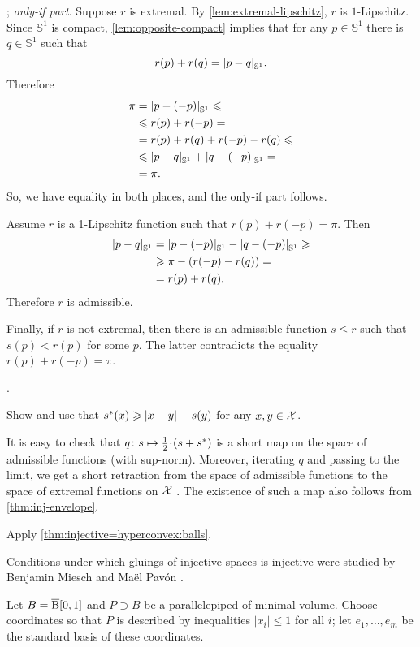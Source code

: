 \parbf{\ref{ex:circle}}; \textit{only-if part}.
Suppose $r$ is extremal.
By \ref{lem:extremal-lipschitz}, $r$ is $1$-Lipschitz.
Since $\mathbb{S}^1$ is compact, \ref{lem:opposite-compact} implies that for any $p\in \mathbb{S}^1$ there is $q\in \mathbb{S}^1$ such that 
\[r(p)+r (q) = \dist{p}{q}{\mathbb{S}^1}.\]
Therefore
\begin{align*}
\pi&=\dist{p}{(-p)}{\mathbb{S}^1}\le 
\\
&\le 
r(p)+r(-p)=
\\
&=
r(p)+r(q) +r(-p) -r(q)\le
\\
&\le
\dist{p}{q}{\mathbb{S}^1}+\dist{q}{(-p)}{\mathbb{S}^1}=
\\
&=\pi.
\end{align*}
So, we have equality in both places, and the only-if part follows.

Assume $r$ is a 1-Lipschitz function such that $r(p)+r(-p)=\pi$.
Then 
\begin{align*}
\dist pq{\mathbb{S}^1}&=
\dist{p}{(-p)}{\mathbb{S}^1}-\dist{q}{(-p)}{\mathbb{S}^1}\ge
\\
&\ge\pi -(r(-p)-r(q))=
\\
&=r(p)+r(q).
\end{align*}
Therefore $r$ is admissible.

Finally, if $r$ is not extremal, then there is an admissible function $s\le r$ such that $s(p)<r(p)$ for some $p$.
The latter contradicts the equality $r(p)+r(-p)=\pi$.

 \cite[Proposition 2.7]{zuest}.

Show and use that
$s^*(x)\ge \dist{x}{y}{}-s(y)$
for any $x,y\in \mathcal{X}$.

It is easy to check that $q\:s\z\mapsto \tfrac12\cdot(s+s^*)$ is a short map on the space of admissible functions (with sup-norm).
Moreover, iterating $q$ and passing to the limit, we get a short retraction from the space of admissible functions to the space of extremal functions on $\mathcal{X}$ \cite[see 3.1 in][]{lang-2013}.
The existence of such a map also follows from \ref{thm:inj-envelope}.

Apply \ref{thm:injective=hyperconvex:balls}.

Conditions under which gluings of injective spaces is injective were studied by Benjamin Miesch and Maël Pavón \cite{miesch,miesch-pavon}.

Let $B=\overline{\mathrm{B}}{}[0,1]$ and $P\supset B$ be a parallelepiped of minimal volume.
Choose coordinates so that $P$ is described by inequalities
$|x_i|\le 1$ for all $i$;
let $e_1,\dots,e_m$ be the standard basis of these coordinates.


